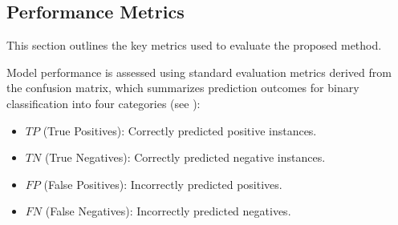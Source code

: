 \documentclass[10pt,twocolumn]{article}
\begin{document}
%
%
%
%
%
%
%
%
%


\subsection{Performance Metrics}

This section outlines the key metrics used to evaluate the proposed method.

Model performance is assessed using standard evaluation metrics derived from the confusion matrix, which summarizes prediction outcomes for binary classification into four categories (see \cite{CC}):\vspace{1mm}

\begin{itemize}
\item $TP$ (True Positives): Correctly predicted positive instances.
\item $TN$ (True Negatives): Correctly predicted negative instances.
\item $FP$ (False Positives): Incorrectly predicted positives.
\item $FN$ (False Negatives): Incorrectly predicted negatives.
\end{itemize}
\end{document}
